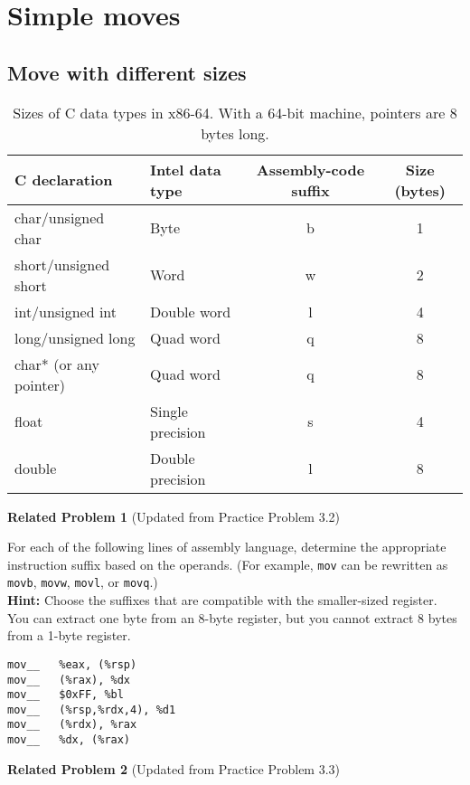 \section{Simple moves}
\subsection{Move with different sizes}
\begin{table}[h]
    \centering
    \small
    \renewcommand{\arraystretch}{1.2}
    \begin{tabular}{l l c c}
        \toprule
        \textbf{C declaration} & \textbf{Intel data type} & \textbf{Assembly-code suffix} 
        & \textbf{Size (bytes)} \\
        \midrule
        char/unsigned char     & Byte             & b  & 1 \\
        short/unsigned short    & Word             & w  & 2 \\
        int/unsigned int      & Double word      & l  & 4 \\
        long/unsigned long     & Quad word        & q  & 8 \\
        char* (or any pointer)  & Quad word        & q  & 8 \\
        float    & Single precision & s  & 4 \\
        double   & Double precision & l  & 8 \\
        \bottomrule
    \end{tabular}
    \caption{Sizes of C data types in x86-64. With a 64-bit machine, pointers are 8 bytes long.}
    \label{tab:c_data_types}
\end{table}


\noindent\textbf{Related Problem 1} (Updated from Practice Problem 3.2)

\vspace{5pt}

For each of the following lines of assembly language, determine the appropriate instruction 
suffix based on the operands. (For example, \texttt{mov} can be rewritten as \texttt{movb}, 
\texttt{movw}, \texttt{movl}, or \texttt{movq}.) \\
%
\textbf{Hint:} Choose the suffixes that are compatible with the smaller-sized register. You 
can extract one byte from an 8-byte register, but you cannot extract 8 bytes from a 1-byte 
register.
%

\vspace{10pt}

\begin{lstlisting}[basicstyle=\ttfamily, frame=none]
mov__   %eax, (%rsp)        
mov__   (%rax), %dx         
mov__   $0xFF, %bl          
mov__   (%rsp,%rdx,4), %d1  
mov__   (%rdx), %rax        
mov__   %dx, (%rax)        
\end{lstlisting} 
%
\noindent\textbf{Related Problem 2} (Updated from Practice Problem 3.3)

